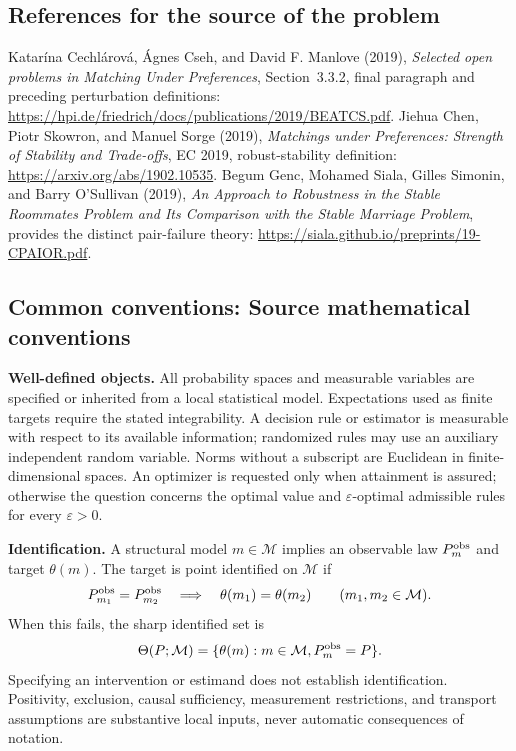 \documentclass[11pt,a4paper]{article}
\begin{document}
\subsection*{References for the source of the problem}
Katar\'ina Cechl\'arov\'a, \'Agnes Cseh, and David F. Manlove (2019), \emph{Selected open problems in Matching Under Preferences}, Section~3.3.2, final paragraph and preceding perturbation definitions: \url{https://hpi.de/friedrich/docs/publications/2019/BEATCS.pdf}. Jiehua Chen, Piotr Skowron, and Manuel Sorge (2019), \emph{Matchings under Preferences: Strength of Stability and Trade-offs}, EC 2019, robust-stability definition: \url{https://arxiv.org/abs/1902.10535}. Begum Genc, Mohamed Siala, Gilles Simonin, and Barry O'Sullivan (2019), \emph{An Approach to Robustness in the Stable Roommates Problem and Its Comparison with the Stable Marriage Problem}, provides the distinct pair-failure theory: \url{https://siala.github.io/preprints/19-CPAIOR.pdf}.

\subsection*{Common conventions: Source mathematical conventions}

\textbf{Well-defined objects.}
All probability spaces and measurable variables are specified or inherited
from a local statistical model. Expectations used as finite targets require
the stated integrability. A decision rule or estimator is measurable with
respect to its available information; randomized rules may use an auxiliary
independent random variable. Norms without a subscript are Euclidean in
finite-dimensional spaces. An optimizer is requested only when attainment
is assured; otherwise the question concerns the optimal value and
$\varepsilon$-optimal admissible rules for every $\varepsilon>0$.

\textbf{Identification.}
A structural model $m\in\mathcal M$ implies an observable law
$P_m^{\rm obs}$ and target $\theta(m)$. The target is point identified on
$\mathcal M$ if
\[
 P_{m_1}^{\rm obs}=P_{m_2}^{\rm obs}
 \quad\Longrightarrow\quad\theta(m_1)=\theta(m_2)
 \qquad(m_1,m_2\in\mathcal M).
\]
When this fails, the sharp identified set is
\[
 \Theta(P;\mathcal M)=\{\theta(m):m\in\mathcal M,
                                  P_m^{\rm obs}=P\}.
\]
Specifying an intervention or estimand does not establish identification.
Positivity, exclusion, causal sufficiency, measurement restrictions, and
transport assumptions are substantive local inputs, never automatic
consequences of notation.
\end{document}
